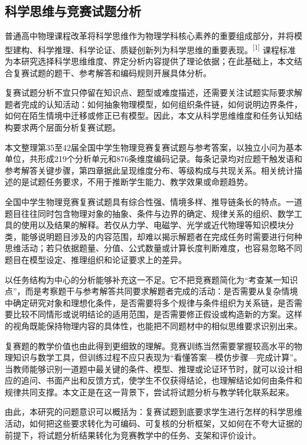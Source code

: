 \documentclass[
  12pt,
  a4paper]{ctexbook}
\begin{document}
\subsection{科学思维与竞赛试题分析}\label{ux79d1ux5b66ux601dux7ef4ux4e0eux7adeux8d5bux8bd5ux9898ux5206ux6790}

普通高中物理课程改革将科学思维作为物理学科核心素养的重要组成部分，并将模型建构、科学推理、科学论证、质疑创新列为科学思维的重要表现。\textsuperscript{[1]}
课程标准为本研究选择科学思维维度、界定分析内容提供了理论依据；在此基础上，本文结合复赛试题的题干、参考解答和编码规则开展具体分析。

复赛试题分析不宜只停留在知识点、题型或难度描述，还需要关注试题实际要求解题者完成的认知活动：如何抽象物理模型，如何组织条件链，如何说明边界条件，如何在陌生情境中迁移或修正已有模型。因此，本文从科学思维维度和任务认知结构要求两个层面分析复赛试题。

本文整理第35至42届全国中学生物理竞赛复赛试题与参考答案，以独立小问为基本单位，共形成219个分析单元和876条维度编码记录。每条记录均对应题干触发语和参考解答关键步骤，第四章据此呈现维度分布、等级构成与共现关系。相关统计描述的是试题任务要求，不用于推断学生能力、教学效果或命题趋势。

全国中学生物理竞赛复赛试题具有综合性强、情境多样、推导链条长的特点。一道题目往往同时包含物理对象的抽象、条件与边界的确定、规律关系的组织、数学工具的使用以及结果的解释。若仅从力学、电磁学、光学或近代物理等知识模块分类，能够说明题目涉及的内容范围，却难以揭示解题者在完成任务时需要进行何种思维活动；若只依据题量、分值、公式数量或计算长度判断难度，也容易忽略不同题目在模型设定、推理组织和论证要求上的差异。

以任务结构为中心的分析能够补充这一不足。它不把竞赛题简化为``考查某一知识点''，而是考察题干与参考解答共同要求解题者完成的活动：是否需要从复杂情境中确定研究对象和理想化条件，是否需要将多个规律与条件组织为关系链，是否需要比较不同情形或说明结论的适用范围，是否需要修正假设或构造新的方案。这样的视角既能保持物理内容的具体性，也能把不同题材中的相似思维要求识别出来。

复赛题的教学价值也由此得到更细致的理解。竞赛训练当然需要掌握较高水平的物理知识与数学工具，但训练过程不应只表现为``看懂答案---模仿步骤---完成计算''。当教师能够识别一道题中最关键的条件、模型、推理或论证环节时，就可以设计相应的追问、书面产出和反馈方式，使学生不仅获得结论，也理解结论如何由条件和规律共同支撑。本文正是在这一背景下，尝试将试题分析与教学转化联系起来。

由此，本研究的问题意识可以概括为：复赛试题到底要求学生进行怎样的科学思维活动，如何把这些要求转化为可编码、可复核的分析框架，又如何在不夸大证据的前提下，将试题分析结果转化为竞赛教学中的任务、支架和评价设计。
\end{document}
